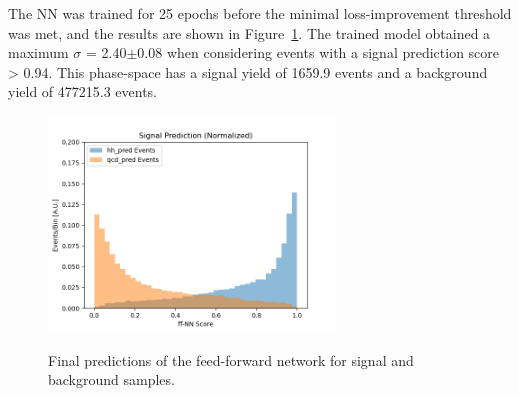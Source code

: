 The NN was trained for 25 epochs before the minimal loss-improvement threshold was met, and the results are shown in Figure~\ref{fig:results_nn}. The trained model obtained a maximum $\sigma$ = 2.40$\pm$0.08 when considering events with a signal prediction score > 0.94. This phase-space has a signal yield of 1659.9 events and a background yield of 477215.3 events.

\begin{figure}[!h] 
\begin{center}
   \includegraphics[width = 3in]{ffNN/figures/score_ffnn_v3}\\
\caption{Final predictions of the feed-forward network for signal and background samples.}
  \label{fig:results_nn}
\end{center}
\end{figure}

